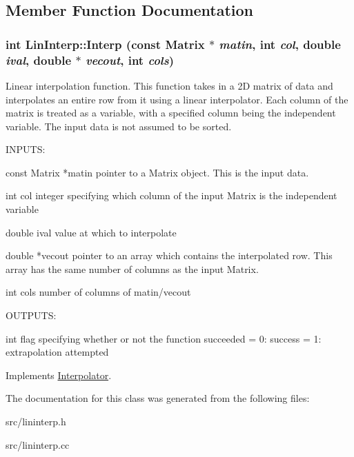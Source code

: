 \subsection{Member Function Documentation}
\hypertarget{classLinInterp_a26aeb03c387bf5c8ea5db0ed111b5cd7}{
\subsubsection[{Interp}]{\setlength{\rightskip}{0pt plus 5cm}int LinInterp::Interp (const {\bf Matrix} $\ast$ {\em matin}, \/  int {\em col}, \/  double {\em ival}, \/  double $\ast$ {\em vecout}, \/  int {\em cols})}}
\label{d8/dee/classLinInterp_a26aeb03c387bf5c8ea5db0ed111b5cd7}


Linear interpolation function. This function takes in a 2D matrix of data and interpolates an entire row from it using a linear interpolator. Each column of the matrix is treated as a variable, with a specified column being the independent variable. The input data is not assumed to be sorted.

\begin{DoxyVerb}
  INPUTS:

  const Matrix *matin    pointer to a Matrix object. This is the input data.

  int col                integer specifying which column of the input Matrix is the independent 
                         variable

  double ival            value at which to interpolate

  double *vecout         pointer to an array which contains the interpolated row. This array has
                         the same number of columns as the input Matrix.

  int cols               number of columns of matin/vecout


  OUTPUTS:

  int                    flag specifying whether or not the function succeeded
                         = 0: success
			 = 1: extrapolation attempted
\end{DoxyVerb}
 

Implements \hyperlink{classInterpolator_a2238defccb009047f624bda33cc47c73}{Interpolator}.

The documentation for this class was generated from the following files:\begin{DoxyCompactItemize}
\item 
src/lininterp.h\item 
src/lininterp.cc\end{DoxyCompactItemize}
